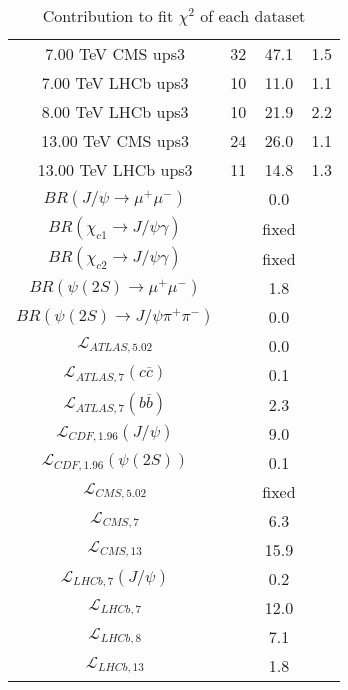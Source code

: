 \begin{table}[h!]
\begin{tabular}{c|c|c|c}
7.00 TeV CMS ups3 & 32 & 47.1 & 1.5 \\
7.00 TeV LHCb ups3 & 10 & 11.0 & 1.1 \\
8.00 TeV LHCb ups3 & 10 & 21.9 & 2.2 \\
13.00 TeV CMS ups3 & 24 & 26.0 & 1.1 \\
13.00 TeV LHCb ups3 & 11 & 14.8 & 1.3 \\
\hline
$BR(J/\psi\rightarrow\mu^+\mu^-)$ &  & 0.0 &  \\
$BR(\chi_{c1}\rightarrow J/\psi\gamma)$ &  & fixed & \\
$BR(\chi_{c2}\rightarrow J/\psi\gamma)$ &  & fixed & \\
$BR(\psi(2S)\rightarrow\mu^+\mu^-)$ &  & 1.8 &  \\
$BR(\psi(2S)\rightarrow J/\psi\pi^+\pi^-)$ &  & 0.0 &  \\
$\mathcal L_{ATLAS,5.02}$ &  & 0.0 &  \\
$\mathcal L_{ATLAS,7}(c\overline c)$ &  & 0.1 &  \\
$\mathcal L_{ATLAS,7}(b\overline b)$ &  & 2.3 &  \\
$\mathcal L_{CDF,1.96}(J/\psi)$ &  & 9.0 &  \\
$\mathcal L_{CDF,1.96}(\psi(2S))$ &  & 0.1 &  \\
$\mathcal L_{CMS,5.02}$ &  & fixed & \\
$\mathcal L_{CMS,7}$ &  & 6.3 &  \\
$\mathcal L_{CMS,13}$ &  & 15.9 &  \\
$\mathcal L_{LHCb,7}(J/\psi)$ &  & 0.2 &  \\
$\mathcal L_{LHCb,7}$ &  & 12.0 &  \\
$\mathcal L_{LHCb,8}$ &  & 7.1 &  \\
$\mathcal L_{LHCb,13}$ &  & 1.8 &  \\
\end{tabular}
\caption{Contribution to fit $\chi^2$ of each dataset}
\end{table}
